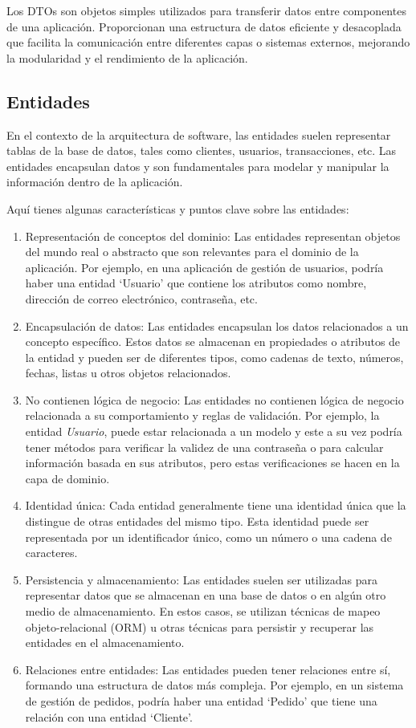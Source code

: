 \documentclass[executivepaper]{article}
\begin{document}
Los DTOs son objetos simples utilizados para transferir datos entre componentes de una aplicación. Proporcionan una estructura de datos eficiente y desacoplada que facilita la comunicación entre diferentes capas o sistemas externos, mejorando la modularidad y el rendimiento de la aplicación.

\subsection{Entidades}

En el contexto de la arquitectura de software, las entidades suelen representar tablas de la base de datos, tales como clientes, usuarios, transacciones, etc. Las entidades encapsulan datos y son fundamentales para modelar y manipular la información dentro de la aplicación.

Aquí tienes algunas características y puntos clave sobre las entidades:
\begin{enumerate}
    \item Representación de conceptos del dominio: Las entidades representan objetos del mundo real o abstracto que son relevantes para el dominio de la aplicación. Por ejemplo, en una aplicación de gestión de usuarios, podría haber una entidad \enquote*{Usuario} que contiene los atributos como nombre, dirección de correo electrónico, contraseña, etc.
    \item Encapsulación de datos: Las entidades encapsulan los datos relacionados a un concepto específico. Estos datos se almacenan en propiedades o atributos de la entidad y pueden ser de diferentes tipos, como cadenas de texto, números, fechas, listas u otros objetos relacionados.
    \item No contienen lógica de negocio: Las entidades no contienen lógica de negocio relacionada a su comportamiento y reglas de validación. Por ejemplo, la entidad \emph*{Usuario}, puede estar relacionada a un modelo y este a su vez podría tener métodos para verificar la validez de una contraseña o para calcular información basada en sus atributos, pero estas verificaciones se hacen en la capa de dominio.
    \item Identidad única: Cada entidad generalmente tiene una identidad única que la distingue de otras entidades del mismo tipo. Esta identidad puede ser representada por un identificador único, como un número o una cadena de caracteres.
    \item Persistencia y almacenamiento: Las entidades suelen ser utilizadas para representar datos que se almacenan en una base de datos o en algún otro medio de almacenamiento. En estos casos, se utilizan técnicas de mapeo objeto-relacional (ORM) u otras técnicas para persistir y recuperar las entidades en el almacenamiento.
    \item Relaciones entre entidades: Las entidades pueden tener relaciones entre sí, formando una estructura de datos más compleja. Por ejemplo, en un sistema de gestión de pedidos, podría haber una entidad \enquote*{Pedido} que tiene una relación con una entidad \enquote*{Cliente}.
\end{enumerate}
\end{document}
